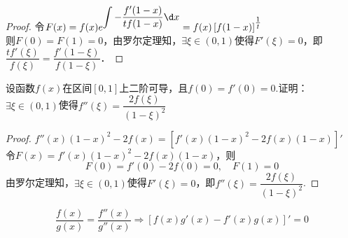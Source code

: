 \documentclass[12pt, a4paper, oneside, UTF8]{ctexbook}
\begin{document}
\begin{proof}
    令$F(x)=f(x)e^{\displaystyle\int -\dfrac{f'(1-x)}{t f(1-x)} \d x}=f(x)\left[f(1-x)\right]^{\tfrac{1}{t}}$\\
    则$F(0)=F(1)=0$，由罗尔定理知，$\exists \xi \in (0,1)$使得$F'(\xi)=0$，即$\dfrac{tf'(\xi)}{f(\xi)}=\dfrac{f'(1-\xi)}{f(1-\xi)}$．
\end{proof}
\begin{exercise}
    设函数$f(x)$在区间$[0,1]$上二阶可导，且$f(0)=f'(0)=0.$证明：$\exists \xi \in (0,1)$使得$f''(\xi)=\dfrac{2f(\xi)}{(1-\xi)^2}$
\end{exercise}
\begin{proof}
    $f''(x)(1-x)^2 - 2f(x) = [f'(x)(1-x)^2 - 2f(x)(1-x)]'$\\
    令$F(x)=f'(x)(1-x)^2 - 2f(x)(1-x)$，则
    \[
        F(0)=f'(0)-2f(0)=0, \quad F(1)=0
    \]
    由罗尔定理知，$\exists \xi \in (0,1)$使得$F'(\xi)=0$，即$f''(\xi)=\dfrac{2f(\xi)}{(1-\xi)^2}$.
\end{proof}
\begin{myRemark}
    \[
        \dfrac{f(x)}{g(x)} = \dfrac{f''(x)}{g''(x) }\Rightarrow [f(x)g'(x)-f'(x)g(x)]'=0
    \]
\end{myRemark}
\ifx\allfiles\undefined
\end{document}
